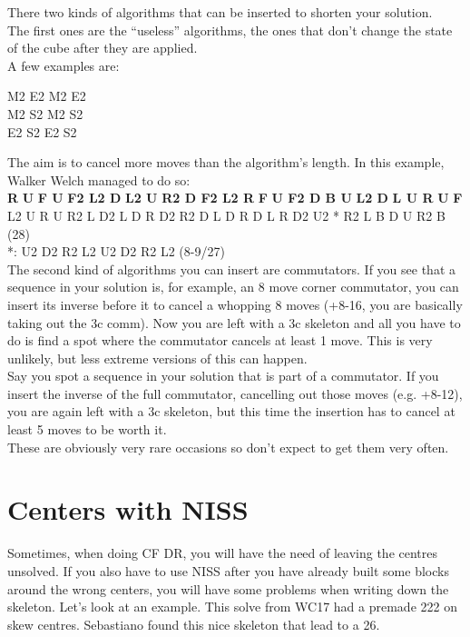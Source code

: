 \documentclass[11pt,a4paper]{book}
\newcommand{\p}{\textquotesingle}
\newcommand{\ps}{\p\,\,}
\begin{document}
There two kinds of algorithms that can be inserted to shorten your solution.\\
The first ones are the “useless” algorithms, the ones that don’t change the state of the cube after they are applied.\\
\newline
A few examples are:
\begin{center}
M2 E2 M2 E2\\
M2 S2 M2 S2\\
E2 S2 E2 S2\\
\end{center}
The aim is to cancel more moves than the algorithm’s length. In this example, Walker Welch managed to do so:\\
\newline
\textbf{R\ps U\ps F U\ps F2 L2 D\ps L2 U\ps R2 D F2 L2 R\ps F\ps U F2 D B U\ps L2 D\ps L U R\ps U\ps F}\\
\newline
L2 U\ps R U R2 L D2 L\ps D R\ps D2 R2 D\ps L\ps D R\ps D\ps L R\ps D2 U2 * R2 L\ps B D U R2 B (28)\\
*: U2 D2 R2 L2 U2 D2 R2 L2 (8-9/27)\\
\newline
The second kind of algorithms you can insert are commutators. If you see that a sequence in your solution is, for example, an 8 move corner commutator, you can insert its inverse before it to cancel a whopping 8 moves (+8-16, you are basically taking out the 3c comm). Now you are left with a 3c skeleton and all you have to do is find a spot where the commutator cancels at least 1 move. This is very unlikely, but less extreme versions of this can happen. \\
Say you spot a sequence in your solution that is part of a commutator. If you insert the inverse of the full commutator, cancelling out those moves (e.g. +8-12), you are again left with a 3c skeleton, but this time the insertion has to cancel at least 5 moves to be worth it.\\
\newline
These are obviously very rare occasions so don’t expect to get them very often.\\


\section{Centers with NISS}

Sometimes, when doing CF DR, you will have the need of leaving the centres unsolved. If you also have to use NISS after you have already built some blocks around the wrong centers, you will have some problems when writing down the skeleton. Let’s look at an example.
This solve from WC17 had a premade 222 on skew centres. Sebastiano found this nice skeleton that lead to a 26.
\end{document}
